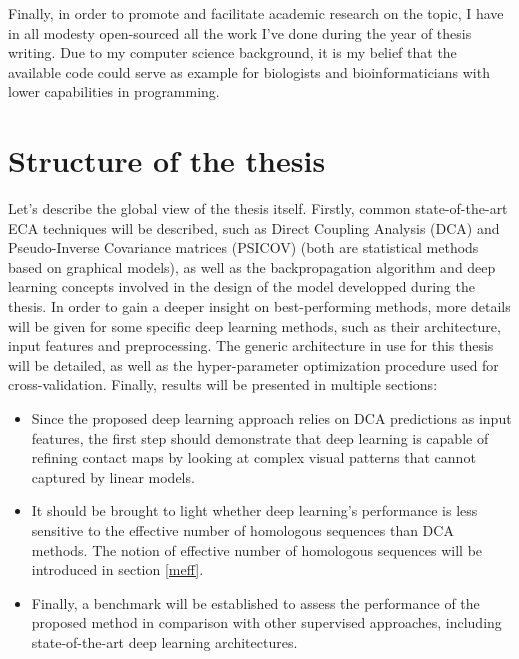     Finally, in order to promote and facilitate academic research on the topic, I have in all modesty
    open-sourced all the work I've done during the year of thesis writing.
    Due to my computer science background, it is my belief that the
    available code could serve as example for biologists and bioinformaticians
    with lower capabilities in programming.

\section{Structure of the thesis}

    Let's describe the global view of the thesis itself.
    Firstly, common state-of-the-art ECA techniques will be described, such as Direct Coupling Analysis (DCA)
    and Pseudo-Inverse Covariance matrices (PSICOV) (both are statistical methods based on graphical models),
    as well as the backpropagation algorithm and deep learning concepts involved in the design
    of the model developped during the thesis.
    In order to gain a deeper insight on best-performing methods, more details will be given for
    some specific deep learning methods, such as their architecture, input features and preprocessing.
    The generic architecture in use for this thesis will be detailed, as well as the hyper-parameter
    optimization procedure used for cross-validation.
    Finally, results will be presented in multiple sections:
    \begin{itemize}
        \item Since the proposed deep learning approach relies on DCA predictions as input features,
        the first step should demonstrate that deep learning is capable of refining
        contact maps by looking at complex visual patterns that cannot captured by linear models.
        \item It should be brought to light whether deep learning's performance is less sensitive to the effective
        number of homologous sequences than DCA methods. The notion of effective number of homologous sequences
        will be introduced in section \ref{meff}.
        \item Finally, a benchmark will be established to assess the performance of the proposed method
        in comparison with other supervised approaches, including state-of-the-art deep learning architectures.
    \end{itemize}
